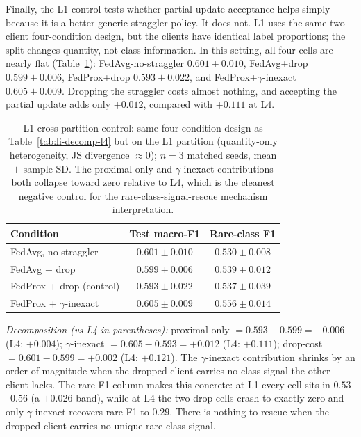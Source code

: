 \documentclass[11pt,a4paper]{report}
\begin{document}
Finally, the L1 control tests whether partial-update acceptance helps simply
because it is a better generic straggler policy. It does not. L1 uses the
same two-client four-condition design, but the clients have identical label
proportions; the split changes quantity, not class information. In this
setting, all four cells are nearly flat (Table~\ref{tab:li-decomp-l1}):
FedAvg-no-straggler $0.601 \pm 0.010$, FedAvg+drop $0.599 \pm 0.006$,
FedProx+drop $0.593 \pm 0.022$, and FedProx+$\gamma$-inexact
$0.605 \pm 0.009$. Dropping the straggler costs almost nothing, and accepting
the partial update adds only $+0.012$, compared with $+0.111$ at L4.

\begin{table}[H]
\centering
\caption{L1 cross-partition control: same four-condition design as
Table~\ref{tab:li-decomp-l4} but on the L1 partition (quantity-only
heterogeneity, JS divergence $\approx 0$); $n=3$ matched seeds, mean
$\pm$ sample SD. The proximal-only and $\gamma$-inexact contributions both
collapse toward zero relative to L4, which is the cleanest negative
control for the rare-class-signal-rescue mechanism interpretation.}
\label{tab:li-decomp-l1}
\small
\begin{tabular}{lcc}
\toprule
Condition                                       & Test macro-F1        & Rare-class F1 \\
\midrule
FedAvg, no straggler                            & $0.601 \pm 0.010$    & $0.530 \pm 0.008$ \\
FedAvg + drop                                   & $0.599 \pm 0.006$    & $0.539 \pm 0.012$ \\
FedProx + drop (control)                        & $0.593 \pm 0.022$    & $0.537 \pm 0.039$ \\
FedProx + $\gamma$-inexact                      & $0.605 \pm 0.009$    & $0.556 \pm 0.014$ \\
\bottomrule
\end{tabular}

\smallskip
\noindent\textit{Decomposition (vs L4 in parentheses):}
proximal-only $= 0.593 - 0.599 = -0.006$ (L4: $+0.004$);
$\gamma$-inexact $= 0.605 - 0.593 = +0.012$ (L4: $+0.111$);
drop-cost $= 0.601 - 0.599 = +0.002$ (L4: $+0.121$). The $\gamma$-inexact
contribution shrinks by an order of magnitude when the dropped client
carries no class signal the other client lacks. The rare-F1 column makes
this concrete: at L1 every cell sits in $0.53$--$0.56$ (a $\pm 0.026$
band), while at L4 the two drop cells crash to exactly zero and only
$\gamma$-inexact recovers rare-F1 to $0.29$. There is nothing to rescue
when the dropped client carries no unique rare-class signal.
\end{table}
\end{document}

